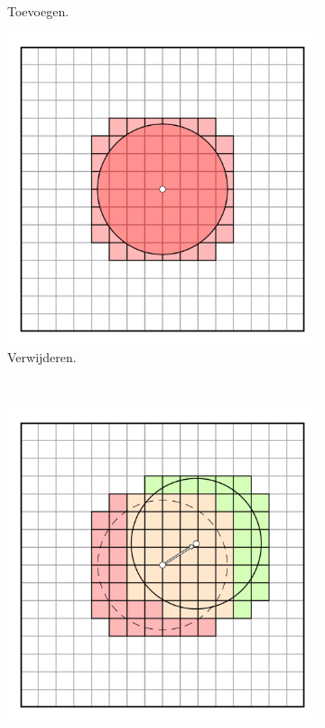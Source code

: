 \begin{figure}[t]
\begin{subfigure}[b]{0.3\textwidth}
    \caption{Toevoegen.}
    \label{fig:dl-transformaties:add}
  \end{subfigure}%
  \begin{subfigure}[b]{0.3\textwidth}
    \includegraphics[width=\textwidth]{./img/raw/dl-transformations/remove.png}
    \caption{Verwijderen.}
    \label{fig:dl-transformaties:remove}
  \end{subfigure}\\
  \begin{subfigure}[b]{0.3\textwidth} %
    \includegraphics[width=\textwidth]{./img/raw/dl-transformations/translation.png}

\end{subfigure}
\end{figure}
